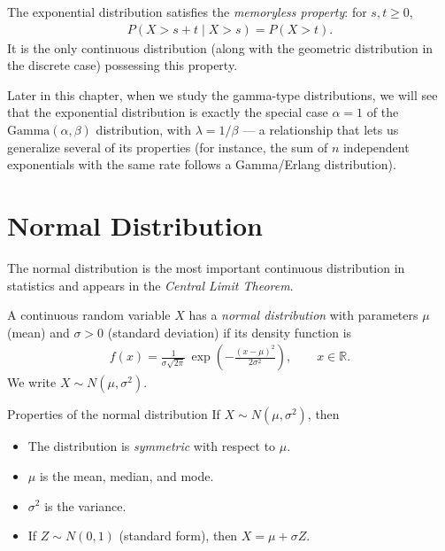 \begin{observacion}
The exponential distribution satisfies the \emph{memoryless property}: for $s, t \geq 0$,
\begin{align}
 P(X > s + t \mid X > s) = P(X > t).
\end{align}
It is the only continuous distribution (along with the geometric distribution in the discrete case) possessing this property.
\end{observacion}

\begin{observacion}
Later in this chapter, when we study the gamma-type distributions, we will see that the
exponential distribution is exactly the special case $\alpha=1$ of the
$\text{Gamma}(\alpha,\beta)$ distribution, with $\lambda = 1/\beta$ — a relationship
that lets us generalize several of its properties (for instance, the sum of $n$
independent exponentials with the same rate follows a Gamma/Erlang distribution).
\end{observacion}

\section{Normal Distribution}

The normal distribution is the most important continuous distribution in statistics and appears in the \emph{Central Limit Theorem}.

\begin{definicion}
A continuous random variable $X$ has a \emph{normal distribution} with parameters $\mu$ (mean) and $\sigma > 0$ (standard deviation) if its density function is
\begin{align}
 \label{eq:2.8.3}
 f(x) = \frac{1}{\sigma\sqrt{2\pi}}\,\exp\!\left(-\frac{(x-\mu)^2}{2\sigma^2}\right),
 \qquad x \in \mathbb{R}.
\end{align}
We write $X \sim N(\mu, \sigma^2)$.
\end{definicion}

{Properties of the normal distribution} If $X \sim N(\mu,\sigma^2)$, then
\begin{itemize}
 \item The distribution is \emph{symmetric} with respect to $\mu$.
 \item $\mu$ is the mean, median, and mode.
 \item $\sigma^2$ is the variance.
 \item If $Z \sim N(0,1)$ (standard form), then $X = \mu + \sigma Z$.
\end{itemize}


